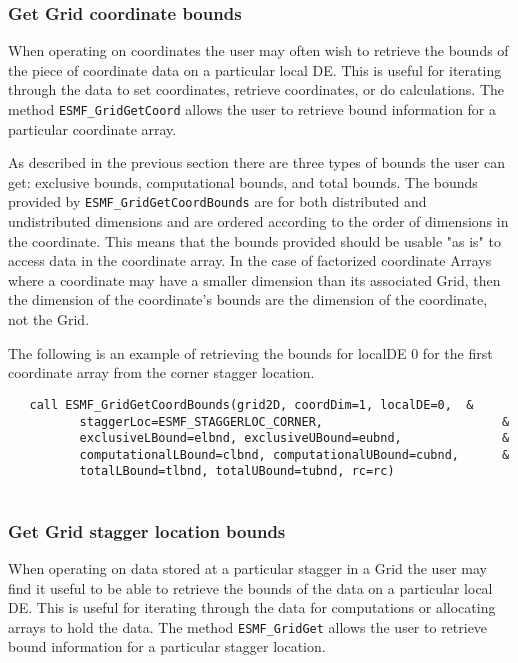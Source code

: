   \subsubsection{Get Grid coordinate bounds}
  
   When operating on coordinates the user may often wish to
   retrieve the bounds of the piece of coordinate data on
   a particular local DE. This is useful for iterating through the
   data to set coordinates, retrieve coordinates, or do calculations.
   The method {\tt ESMF\_GridGetCoord} allows the user
   to retrieve bound information for a particular coordinate
   array.
  
   As described in the previous section there are three types of bounds the user can
   get: exclusive bounds, computational bounds,
   and total bounds. The bounds
   provided by {\tt ESMF\_GridGetCoordBounds} are for both distributed
   and undistributed dimensions and are ordered according to the
   order of dimensions in the  coordinate. This means that the bounds
    provided should be usable
   "as is" to access data in the coordinate array. In the case
   of factorized coordinate Arrays where a coordinate may
   have a smaller dimension than its associated Grid, then
   the dimension of the coordinate's bounds are the dimension of
   the coordinate, not the Grid.
  
   The following is an example of retrieving the bounds for localDE 0 for the first
   coordinate array from the corner stagger location. 

 \begin{verbatim}
   call ESMF_GridGetCoordBounds(grid2D, coordDim=1, localDE=0,  &
          staggerLoc=ESMF_STAGGERLOC_CORNER,                         &
          exclusiveLBound=elbnd, exclusiveUBound=eubnd,              &
          computationalLBound=clbnd, computationalUBound=cubnd,      &
          totalLBound=tlbnd, totalUBound=tubnd, rc=rc)
 
\end{verbatim}
 

  \subsubsection{Get Grid stagger location bounds}
  
   When operating on data stored at a particular stagger
   in a Grid the user may find it useful to be able
   to retrieve the bounds of the data on a particular local DE.
   This is useful for iterating through the
   data for computations or allocating arrays to hold the data.
   The method {\tt ESMF\_GridGet} allows the user
   to retrieve bound information for a particular stagger location.
  

